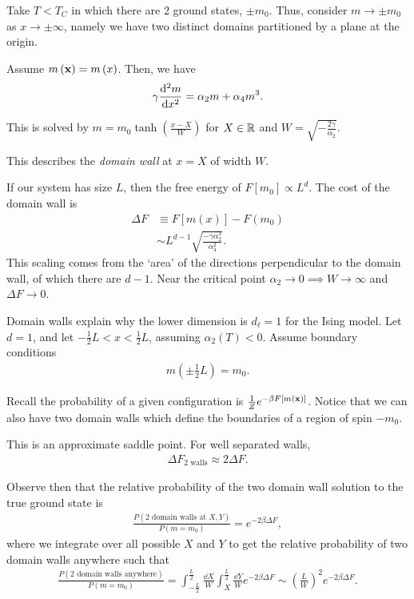 Take $T < T_C$ in which there are 2 ground states, $\pm m_0$. Thus, consider $m \to \pm m_0$ as $x \to \pm \infty$, namely we have two distinct domains partitioned by a plane at the origin.

Assume $m \left( \vb{x} \right) = m \left( x \right) $. Then, we have
\begin{align}
    \gamma \dv[2]{m}{x} = \alpha_2 m + \alpha_4 m^3
.\end{align}

This is solved by $m = m_0 \tanh \left( \frac{x-X}{W} \right) $ for $X \in \mathbb{R}$ and $W = \sqrt{-\frac{2\gamma}{\alpha_2}} $.


This describes the \textit{domain wall} at $x = X$ of width $W$.

If our system has size $L$, then the free energy of $F \left[ m_0 \right] \propto L^{d}$. The cost of the domain wall is 
\begin{align}
    \Delta F &\equiv F \left[ m \left( x \right)  \right] - F \left( m_0 \right)  \\
    &\sim  L^{d-1} \sqrt{\frac{-\gamma \alpha_2^3}{\alpha_4^2}}
.\end{align}
This scaling comes from the `area' of the directions perpendicular to the domain wall, of which there are $d - 1$. Near the critical point $\alpha_2 \to 0 \implies W \to \infty$ and $\Delta F \to 0$.

Domain walls explain why the lower dimension is $d_{\ell} = 1$ for the Ising model. Let $d = 1$, and let $-\frac{1}{2}L < x < \frac{1}{2}L$, assuming $\alpha_2 \left( T \right) < 0$. Assume boundary conditions
\begin{align}
    m \left( \pm \frac{1}{2}L \right) = m_0
.\end{align}

Recall the probability of a given configuration is $\frac{1}{Z}e^{-\beta F \left[ m\left( \vb{x} \right)  \right] }$. Notice that we can also have two domain walls which define the boundaries of a region of spin $-m_0$.


This is an approximate saddle point. For well separated walls,
\begin{align}
    \Delta F_{\text{2 walls}} \approx 2 \Delta F
.\end{align}

Observe then that the relative probability of the two domain wall solution to the true ground state is
\begin{align}
    \frac{P \left( \text{2 domain walls at $X,Y$} \right)}{P \left( m = m_0 \right) }  = e^{-2\beta \Delta F}
,\end{align}
where we integrate over all possible $X$ and $Y$ to get the relative probability of two domain walls anywhere such that
\begin{align}
    \frac{P \left( \text{2 domain walls anywhere} \right)}{P \left( m = m_0 \right) }  = \int_{-\frac{L}{2}}^{\frac{L}{2}} \frac{\dd{X}}{W}\int_X^{\frac{L}{2}} \frac{\dd{Y}}{W}e^{-2\beta \Delta F} \sim  \left( \frac{L}{W} \right)^2 e^{-2 \beta \Delta F}
.\end{align}

